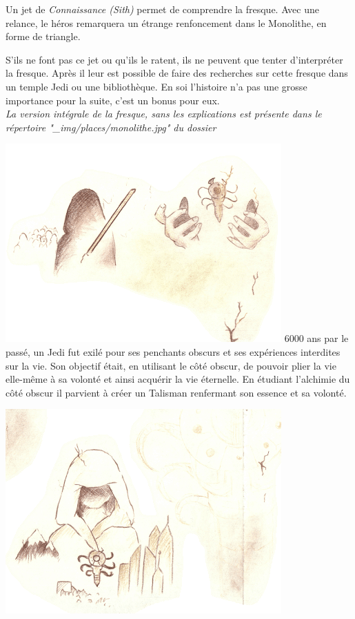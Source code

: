 Un jet de \textit{Connaissance (Sith)} permet de comprendre la fresque. Avec une relance, le héros remarquera un étrange renfoncement dans le Monolithe, en forme de triangle.

S’ils ne font pas ce jet ou qu’ils le ratent, ils ne peuvent que tenter d’interpréter la fresque. Après il leur est possible de faire des recherches sur cette fresque dans un temple Jedi ou une bibliothèque. En soi l’histoire n’a pas une grosse importance pour la suite, c’est un bonus pour eux.
\\

\textit{La version intégrale de la fresque, sans les explications est présente dans le répertoire "\_img/places/monolithe.jpg" du dossier}

\clearpage

\begin{quotebox}
\noindent\includegraphics[width=\linewidth]{_img/places/monolithe-001.png}
6000 ans par le passé, un Jedi fut exilé pour ses penchants obscurs et ses expériences interdites sur la vie. Son objectif était, en utilisant le côté obscur, de pouvoir plier la vie elle-même à sa volonté et ainsi acquérir la vie éternelle. En étudiant l’alchimie du côté obscur il parvient à créer un Talisman renfermant son essence et sa volonté. 

\noindent\includegraphics[width=\linewidth]{_img/places/monolithe-002.png}


\end{quotebox}

